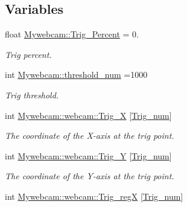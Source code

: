 \subsection*{Variables}
\begin{DoxyCompactItemize}
\item 
\mbox{\label{group___the_gaa6febc47d32f4ec42981f25ea9ae4027}} 
float \hyperlink{group___the_gaa6febc47d32f4ec42981f25ea9ae4027}{Mywebcam\+::\+Trig\+\_\+\+Percent} = 0.
\begin{DoxyCompactList}\small\item\em Trig percent. \end{DoxyCompactList}\item 
\mbox{\label{group___the_ga1df562d0ac4b6d9abfa6019a212d598e}} 
int \hyperlink{group___the_ga1df562d0ac4b6d9abfa6019a212d598e}{Mywebcam\+::threshold\+\_\+num} =1000
\begin{DoxyCompactList}\small\item\em Trig threshold. \end{DoxyCompactList}\item 
\mbox{\label{group___the_ga0cfdf469ae302c1ee567a95e76278e34}} 
int \hyperlink{group___the_ga0cfdf469ae302c1ee567a95e76278e34}{Mywebcam\+::webcam\+::\+Trig\+\_\+X} \mbox{[}\hyperlink{group___the_ga3572c6451d34aaf557cfb88ee365cf16}{Trig\+\_\+num}\mbox{]}
\begin{DoxyCompactList}\small\item\em The coordinate of the X-\/axis at the trig point. \end{DoxyCompactList}\item 
\mbox{\label{group___the_gae6037d203c4f05f5c74b1b99f1cb3525}} 
int \hyperlink{group___the_gae6037d203c4f05f5c74b1b99f1cb3525}{Mywebcam\+::webcam\+::\+Trig\+\_\+Y} \mbox{[}\hyperlink{group___the_ga3572c6451d34aaf557cfb88ee365cf16}{Trig\+\_\+num}\mbox{]}
\begin{DoxyCompactList}\small\item\em The coordinate of the Y-\/axis at the trig point. \end{DoxyCompactList}\item 
\mbox{\label{group___the_ga526db8f9c8606f55d08698cbf664dbc5}} 
int \hyperlink{group___the_ga526db8f9c8606f55d08698cbf664dbc5}{Mywebcam\+::webcam\+::\+Trig\+\_\+regX} \mbox{[}\hyperlink{group___the_ga3572c6451d34aaf557cfb88ee365cf16}{Trig\+\_\+num}\mbox{]}

\end{DoxyCompactItemize}
